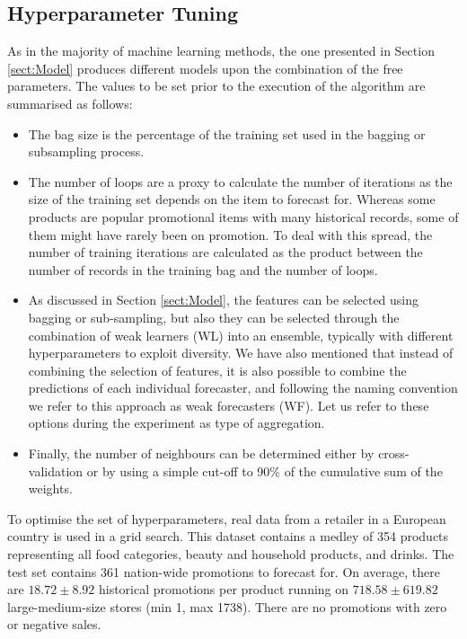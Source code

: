 \documentclass{ieeeaccess}
\begin{document}
\subsection{Hyperparameter Tuning} \label{subSect:HyperParams}



As in the majority of machine learning methods, the one presented in Section \ref{sect:Model} produces different models upon the combination of the free parameters. The values to be set prior to the execution of the algorithm are summarised as follows:

\begin{itemize}
\item The bag size is the percentage of the training set used in the bagging or subsampling process.
\item The number of loops are a proxy to calculate the number of iterations as the size of the training set depends on the item to forecast for. Whereas some products are popular promotional items with many historical records, some of them might have rarely been on promotion. To deal with this spread, the number of training iterations are calculated as the product between the number of records in the training bag and the number of loops.
\item As discussed in Section \ref{sect:Model}, the features can be selected using bagging or sub-sampling, but also they can be selected through the combination of weak learners (WL) into an ensemble, typically with different hyperparameters to exploit diversity. We have also mentioned that instead of combining the selection of features, it is also possible to combine the predictions of each individual forecaster, and following the naming convention we refer to this approach as weak forecasters (WF). Let us refer to these options during the experiment as type of aggregation.
\item Finally, the number of neighbours can be determined either by cross-validation or by using a simple cut-off to 90\% of the cumulative sum of the weights.
\end{itemize}

To optimise the set of hyperparameters, real data from a retailer in a European country is used in a grid search. This dataset contains a medley of 354 products representing all food categories, beauty and household products, and drinks. The test set contains 361 nation-wide promotions to forecast for. On average, there are $18.72 \pm 8.92$ historical promotions per product running on $718.58 \pm 619.82$ large-medium-size stores (min 1, max 1738). There are no promotions with zero or negative sales.
\end{document}
